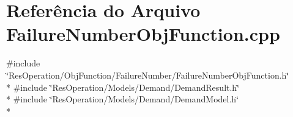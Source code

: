 \section{Referência do Arquivo Failure\+Number\+Obj\+Function.\+cpp}
\label{_obj_function_2_failure_number_2_failure_number_obj_function_8cpp}
{\ttfamily \#include \char`\"{}Res\+Operation/\+Obj\+Function/\+Failure\+Number/\+Failure\+Number\+Obj\+Function.\+h\char`\"{}}\\*
{\ttfamily \#include \char`\"{}Res\+Operation/\+Models/\+Demand/\+Demand\+Result.\+h\char`\"{}}\\*
{\ttfamily \#include \char`\"{}Res\+Operation/\+Models/\+Demand/\+Demand\+Model.\+h\char`\"{}}\\*
